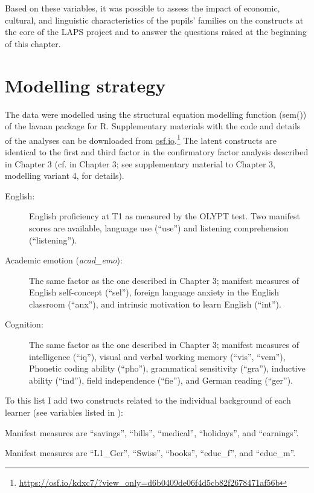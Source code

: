 \documentclass[output=paper]{langsci/langscibook}
\begin{document}
Based on these variables, it was possible to assess the impact of economic, cultural, and linguistic characteristics of the pupils’ families on the constructs at the core of the LAPS project and to answer the questions raised at the beginning of this chapter. 

\section{Modelling strategy}

The data were modelled using the structural equation modelling function (sem()) of the lavaan package \citep{Rosseel2012} for R. Supplementary materials with the code and details of the analyses can be downloaded from \url{osf.io}.\footnote{\url{https://osf.io/kdxc7/?view_only=d6b0409de06f4d5cb82f2678471af56b}} The latent constructs are identical to the first and third factor in the confirmatory factor analysis described in Chapter 3 (cf.  in Chapter 3; see supplementary material to Chapter 3, modelling variant 4, for details). 

\begin{description}
\item[English:] English proficiency at T1 as measured by the OLYPT test. Two manifest scores are available, language use (``use'') and listening comprehension (``listening'').
\item[Academic emotion (\textit{acad\_emo}):] The same factor as the one described in Chapter 3; manifest measures of English self-concept (``sel''), foreign language anxiety in the English classroom (``anx''), and intrinsic motivation to learn English (``int'').
\item[Cognition:] The same factor as the one described in Chapter 3; manifest measures of intelligence (``iq''), visual and verbal working memory (``vis'', ``vem''), Phonetic coding ability (``pho''), grammatical sensitivity (``gra''), inductive ability (``ind''), field independence (``fie''), and German reading (``ger'').
\end{description}

To this list I add two constructs related to the individual background of each learner (see variables listed in ):

\begin{description}\sloppy
\item[Economic predispositions (\textit{econ\_p}):] Manifest measures are ``savings'', ``bills'', ``medical'', ``holidays'', and ``earnings''.
\item[Cultural predispositions (\textit{cult\_p}):] Manifest measures are ``L1\_Ger'', ``Swiss'', ``books'', ``educ\_f'', and ``educ\_m''.
\end{description}
\end{document}
